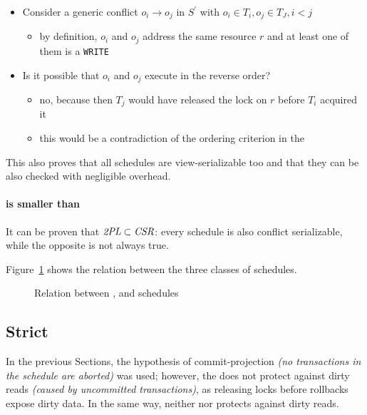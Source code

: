 \documentclass[english]{article}
\begin{document}
\begin{itemize}
  \item Consider a generic conflict \(o_i \rightarrow o_j\) in \(S^\prime\) with \(o_i \in T_i, o_j \in T_J, i < j\)
        \begin{itemize}
          \item by definition, \(o_i\) and \(o_j\) address the same resource \(r\) and at least one of them is a \texttt{WRITE}
        \end{itemize}
  \item Is it possible that \(o_i\) and \(o_j\) execute in the reverse order?
        \begin{itemize}
          \item no, because then \(T_j\) would have released the lock on \(r\) before \(T_i\) acquired it
          \item this would be a contradiction of the ordering criterion in the \TPL
        \end{itemize}
\end{itemize}

\bigskip
This also proves that all \TPL schedules are view-serializable too and that they can be also checked with negligible overhead.

\paragraph{\TPL is smaller than \CSR}

It can be proven that \(\textit{2PL} \subset \textit{CSR}\): every \TPL schedule is also conflict serializable, while the opposite is not always true.

\bigskip
Figure~\ref{fig:relation-between-tpl-csr-vsr-schedules} shows the relation between the three classes of schedules.

\begin{figure}[htbp]
  \centering
  \bigskip
  \caption{Relation between \TPL, \CSR and \VSR schedules}
  \label{fig:relation-between-tpl-csr-vsr-schedules}
  \bigskip
\end{figure}

\subsection{Strict \TPL}

In the previous Sections, the hypothesis of commit-projection \textit{(no transactions in the schedule are aborted)} was used;
however, the \TPL does not protect against dirty reads \textit{(caused by uncommitted transactions)}, as releasing locks before rollbacks expose dirty data.
In the same way, neither \VSR nor \CSR protects against dirty reads.
\end{document}
